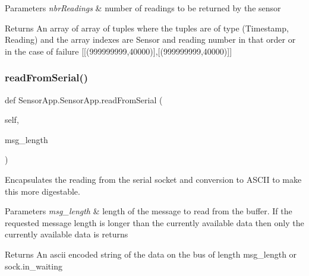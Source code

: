 \begin{DoxyParams}{Parameters}
{\em nbr\+Readings} & number of readings to be returned by the sensor\\
\hline
\end{DoxyParams}
\begin{DoxyReturn}{Returns}
An array of array of tuples where the tuples are of type (Timestamp, Reading) and the array indexes are Sensor and reading number in that order or in the case of failure \mbox{[}\mbox{[}(999999999,40000)\mbox{]},\mbox{[}(999999999,40000)\mbox{]}\mbox{]} 
\end{DoxyReturn}
\mbox{\label{class_sensor_app_1_1_sensor_app_a6558c7ef5bd20ba3d71bb84b24431853}} 
\subsubsection{\texorpdfstring{read\+From\+Serial()}{readFromSerial()}}
{\footnotesize\ttfamily def Sensor\+App.\+Sensor\+App.\+read\+From\+Serial (\begin{DoxyParamCaption}\item[{}]{self,  }\item[{}]{msg\+\_\+length }\end{DoxyParamCaption})}



Encapsulates the reading from the serial socket and conversion to A\+S\+C\+II to make this more digestable. 


\begin{DoxyParams}{Parameters}
{\em msg\+\_\+length} & length of the message to read from the buffer. If the requested message length is longer than the currently available data then only the currently available data is returns\\
\hline
\end{DoxyParams}
\begin{DoxyReturn}{Returns}
An ascii encoded string of the data on the bus of length msg\+\_\+length or sock.\+in\+\_\+waiting 
\end{DoxyReturn}
\mbox{\label{class_sensor_app_1_1_sensor_app_a77bcd8b2f4f3bf1c55e8c7fa105edf46}} 
